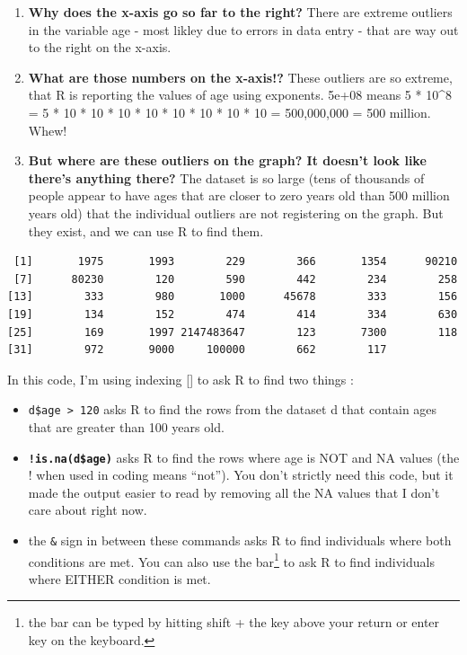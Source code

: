 \documentclass[
  letterpaper,
  DIV=11,
  numbers=noendperiod,
  oneside]{scrreprt}
\newenvironment{Shaded}{\begin{snugshade}}{\end{snugshade}}
\newcommand{\DecValTok}[1]{\textcolor[rgb]{0.68,0.00,0.00}{#1}}
\newcommand{\FunctionTok}[1]{\textcolor[rgb]{0.28,0.35,0.67}{#1}}
\newcommand{\NormalTok}[1]{\textcolor[rgb]{0.00,0.23,0.31}{#1}}
\newcommand{\SpecialCharTok}[1]{\textcolor[rgb]{0.37,0.37,0.37}{#1}}
\providecommand{\tightlist}{%
  \setlength{\itemsep}{0pt}\setlength{\parskip}{0pt}}\usepackage{longtable,booktabs,array}
\begin{document}
\begin{enumerate}
\def\labelenumi{\arabic{enumi}.}
\tightlist
\item
  \textbf{Why does the x-axis go so far to the right?} There are extreme
  outliers in the variable age - most likley due to errors in data entry
  - that are way out to the right on the x-axis.
\item
  \textbf{What are those numbers on the x-axis!?} These outliers are so
  extreme, that R is reporting the values of age using exponents. 5e+08
  means 5 * 10\^{}8 = 5 * 10 * 10 * 10 * 10 * 10 * 10 * 10 * 10 =
  500,000,000 = 500 million. Whew!
\item
  \textbf{But where are these outliers on the graph? It doesn't look
  like there's anything there?} The dataset is so large (tens of
  thousands of people appear to have ages that are closer to zero years
  old than 500 million years old) that the individual outliers are not
  registering on the graph. But they exist, and we can use R to find
  them.
\end{enumerate}

\begin{Shaded}
\end{Shaded}

\begin{verbatim}
 [1]       1975       1993        229        366       1354      90210
 [7]      80230        120        590        442        234        258
[13]        333        980       1000      45678        333        156
[19]        134        152        474        414        334        630
[25]        169       1997 2147483647        123       7300        118
[31]        972       9000     100000        662        117
\end{verbatim}

In this code, I'm using indexing {[}{]} to ask R to find two things :

\begin{itemize}
\item
  \texttt{d\$age\ \textgreater{}\ 120} asks R to find the rows from the
  dataset d that contain ages that are greater than 100 years old.
\item
  \textbf{\texttt{!is.na(d\$age)}} asks R to find the rows where age is
  NOT and NA values (the ! when used in coding means ``not''). You don't
  strictly need this code, but it made the output easier to read by
  removing all the NA values that I don't care about right now.
\item
  the \texttt{\&} sign in between these commands asks R to find
  individuals where both conditions are met. You can also use the
  \texttt{\textbar{}} bar\footnote{the bar can be typed by hitting shift
    + the key above your return or enter key on the keyboard.} to ask R
  to find individuals where EITHER condition is met.
\end{itemize}
\end{document}
